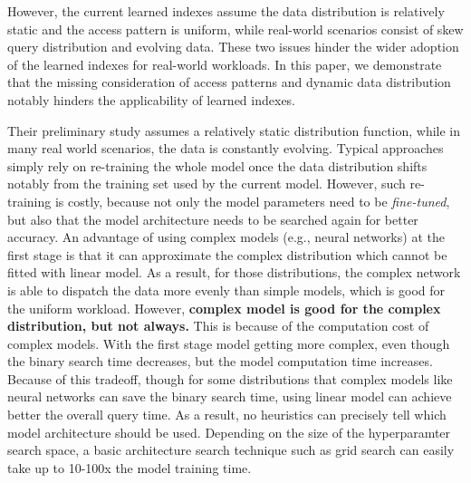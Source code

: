 \begin{bigabstract}
However, the current learned indexes assume the data distribution is relatively static and the access pattern is uniform, while real-world scenarios consist of skew query distribution and evolving data.
These two issues hinder the wider adoption of the learned indexes for real-world workloads.
In this paper, we demonstrate that the missing consideration of access patterns and dynamic data distribution notably hinders the applicability of learned indexes.

Their preliminary study assumes a relatively static distribution function, while in many real world scenarios, the data is constantly evolving.
Typical approaches simply rely on re-training the whole model once the data distribution shifts notably from the training set used by the current model.
However, such re-training is costly, because not only the model parameters need to be \textit{fine-tuned}, but also that the model architecture needs to be searched again for better accuracy.
An advantage of using complex models (e.g., neural networks) at the first stage is that it can approximate the complex distribution which cannot be fitted with linear model.
As a result, for those distributions, the complex network is able to dispatch the data more evenly than simple models, which is good for the uniform workload.
However, \textbf{complex model is good for the complex distribution, but not always.}
This is because of the computation cost of complex models.
With the first stage model getting more complex, even though the binary search time decreases, but the model computation time increases.
Because of this tradeoff, though for some distributions that complex models like neural networks can save the binary search time, using linear model can achieve better the overall query time.
As a result, no heuristics can precisely tell which model architecture should be used.
Depending on the size of the hyperparamter search space, a basic architecture search technique such as grid search can easily take up to 10-100x the model training time.


\end{bigabstract}
